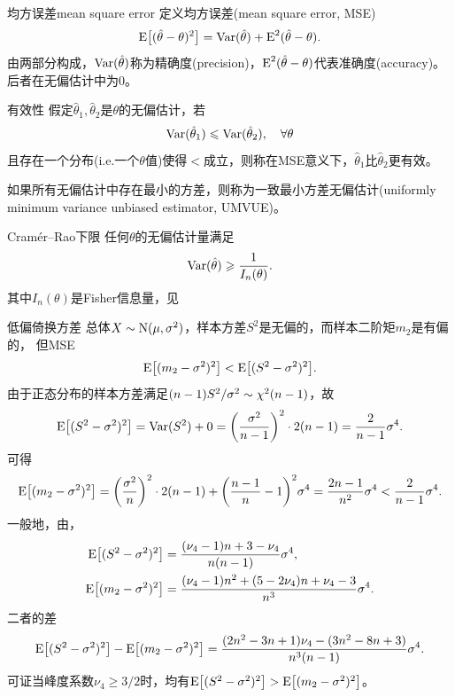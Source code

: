 \begin{definition}{均方误差}{mean square error}
	定义均方误差(mean square error, MSE)
	\begin{equation}
		\operatorname{E}\bigl[(\hat\theta - \theta)^2\bigr] = \operatorname{Var}(\hat\theta) + \operatorname{E}^2(\hat\theta - \theta).
	\end{equation}
	由两部分构成，$\operatorname{Var}(\hat\theta)$称为精确度(precision)，$\operatorname{E}^2(\hat\theta - \theta)$代表准确度(accuracy)。后者在无偏估计中为0。
\end{definition}
\begin{definition}{有效性}{}
	假定$\hat\theta_1,\hat\theta_2$是$\theta$的无偏估计，若
	\begin{equation}\label{eq:ps-estimator-efficiency}
		\operatorname{Var}(\hat\theta_1) \leqslant \operatorname{Var}(\hat\theta_2),\quad\forall\theta
	\end{equation}
	且存在一个分布(i.e.一个$\theta$值)使得$<$成立，则称在MSE意义下，$\hat\theta_1$比$\hat\theta_2$更有效。
	
	如果所有无偏估计中存在最小的方差，则称为一致最小方差无偏估计(uniformly minimum variance unbiased estimator, UMVUE)。
\end{definition}
\begin{theorem}{Cramér--Rao下限}{}
	任何$\theta$的无偏估计量满足
	\begin{equation}
		\operatorname{Var}(\hat\theta) \geqslant \frac1{I_n(\theta)}.
	\end{equation}
	其中$I_n(\theta)$是Fisher信息量，见
\end{theorem}
\begin{example}{低偏倚换方差}{}
	总体$X \sim \operatorname{N}(\mu,\sigma^2)$，样本方差$S^2$是无偏的，而样本二阶矩$m_2$是有偏的，
	但MSE
	\[
		\operatorname{E}\bigl[(m_2 - \sigma^2)^2\bigr] < \operatorname{E}\bigl[(S^2 - \sigma^2)^2\bigr].
	\]
	由于正态分布的样本方差满足$(n - 1)S^2/\sigma^2 \sim \chi^2(n - 1)$，故
	\begin{equation}
		\operatorname{E}\bigl[(S^2 - \sigma^2)^2\bigr] = \operatorname{Var}(S^2) + 0 = \biggl(\frac{\sigma^2}{n - 1}\biggr)^2 \cdot 2(n - 1) = \frac{2}{n - 1}\sigma^4.
	\end{equation}
	可得
	\[
		\operatorname{E}\bigl[(m_2 - \sigma^2)^2\bigr] = \biggl(\frac{\sigma^2}{n}\biggr)^2 \cdot 2(n - 1) + \biggl(\frac{n - 1}n - 1\biggr)^2\sigma^4 = \frac{2n - 1}{n^2}\sigma^4 < \frac{2}{n - 1}\sigma^4.
	\]
	\tcblower
	一般地，由，
	\begin{align*}
		\operatorname{E}\bigl[(S^2 - \sigma^2)^2\bigr] &= \frac{(\nu_4 - 1)n + 3 - \nu_4}{n(n - 1)}\sigma^4,\\
		\operatorname{E}\bigl[(m_2 - \sigma^2)^2\bigr] &= \frac{(\nu_4 - 1)n^2 + (5 - 2\nu_4)n + \nu_4 - 3}{n^3}\sigma^4.
	\end{align*}
	二者的差
	\[
		\operatorname{E}\bigl[(S^2 - \sigma^2)^2\bigr] - \operatorname{E}\bigl[(m_2 - \sigma^2)^2\bigr]
		= \frac{(2n^2 - 3n + 1)\nu_4 - (3n^2 - 8n + 3)}{n^3(n - 1)}\sigma^4.
	\]
	可证当峰度系数$\nu_4 \geqslant 3/2$时，均有$\operatorname{E}\bigl[(S^2 - \sigma^2)^2\bigr] > \operatorname{E}\bigl[(m_2 - \sigma^2)^2\bigr]$。
\end{example}

